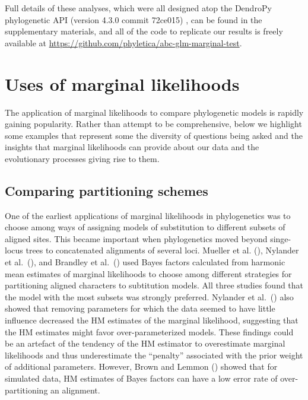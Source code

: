 Full details of these analyses, which were all designed atop the DendroPy
phylogenetic API (version 4.3.0 commit 72ce015) \citep{Sukumaran2010}, can be
found in the supplementary materials, and all of the code to replicate our
results is freely available at
\href{https://github.com/phyletica/abc-glm-marginal-test}{https://github.com/phyletica/abc-glm-marginal-test}.


\section{Uses of marginal likelihoods}

The application of marginal likelihoods to compare phylogenetic models is
rapidly gaining popularity.
Rather than attempt to be comprehensive, below we highlight some examples that
represent some the diversity of questions being asked and the insights that
marginal likelihoods can provide about our data and the evolutionary processes
giving rise to them.

\subsection{Comparing partitioning schemes}

One of the earliest applications of marginal likelihoods in phylogenetics was
to choose among ways of assigning models of substitution to different subsets
of aligned sites.
This became important when phylogenetics moved beyond singe-locus trees to
concatenated alignments of several loci.
Mueller et al. (\citeyear{Mueller2004}),
Nylander et al.\ (\citeyear{NylanderEtal2004}), and
Brandley et al.\ (\citeyear{Brandley2005})
used Bayes factors calculated from harmonic mean
estimates of marginal likelihoods to choose among different strategies for
partitioning aligned characters to subtitution models.
All three studies found that the model with the most subsets was strongly
preferred.
Nylander et al.\ (\citeyear{NylanderEtal2004}) also showed that removing
parameters for which the data seemed to have little influence decreased the HM
estimates of the marginal likelihood, suggesting that the HM estimates might
favor over-parameterized models.
These findings could be an artefact of the tendency of the HM estimator to 
overestimate marginal likelihoods and thus underestimate the ``penalty''
associated with the prior weight of additional parameters.
However, Brown and Lemmon (\citeyear{Brown2007}) showed that for simulated data,
HM estimates of Bayes factors can have a low error rate of over-partitioning an
alignment.

